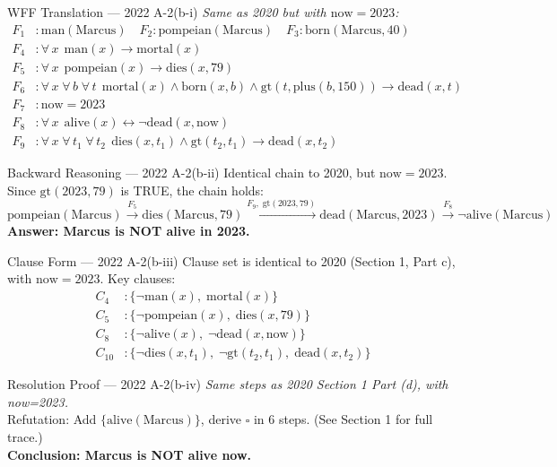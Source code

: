 \documentclass[12pt,a4paper]{article}
\newcommand{\ALL}[1]{\forall\,#1\;}
\newcommand{\ra}{\rightarrow}
\newcommand{\lra}{\leftrightarrow}
\newcommand{\cl}[1]{\{#1\}}      %
\begin{document}
\begin{solbox}{WFF Translation --- 2022 A-2(b-i)}
\textit{Same as 2020 but with $\mathrm{now} = 2023$:}
\begin{align*}
  F_1&: \mathrm{man(Marcus)}\quad F_2: \mathrm{pompeian(Marcus)}\quad F_3: \mathrm{born(Marcus,40)}\\
  F_4&: \ALL{x}\,\mathrm{man}(x)\ra\mathrm{mortal}(x)\\
  F_5&: \ALL{x}\,\mathrm{pompeian}(x)\ra\mathrm{dies}(x,79)\\
  F_6&: \ALL{x}\ALL{b}\ALL{t}\,\mathrm{mortal}(x)\land\mathrm{born}(x,b)\land\mathrm{gt}(t,\mathrm{plus}(b,150))\ra\mathrm{dead}(x,t)\\
  F_7&: \mathrm{now}=2023\\
  F_8&: \ALL{x}\,\mathrm{alive}(x)\lra\neg\mathrm{dead}(x,\mathrm{now})\\
  F_9&: \ALL{x}\ALL{t_1}\ALL{t_2}\,\mathrm{dies}(x,t_1)\land\mathrm{gt}(t_2,t_1)\ra\mathrm{dead}(x,t_2)
\end{align*}
\end{solbox}

\begin{solbox}{Backward Reasoning --- 2022 A-2(b-ii)}
Identical chain to 2020, but $\mathrm{now}=2023$. Since $\mathrm{gt}(2023,79)$ is TRUE, the chain holds:
\[\mathrm{pompeian(Marcus)}\xrightarrow{F_5}\mathrm{dies(Marcus,79)}\xrightarrow{F_9,\;\mathrm{gt}(2023,79)}\mathrm{dead(Marcus,2023)}\xrightarrow{F_8}\neg\mathrm{alive(Marcus)}\]
\textbf{Answer: Marcus is NOT alive in 2023.}
\end{solbox}

\begin{solbox}{Clause Form --- 2022 A-2(b-iii)}
Clause set is identical to 2020 (Section 1, Part c), with $\mathrm{now}=2023$. Key clauses:
\begin{align*}
  C_4&: \cl{\neg\mathrm{man}(x),\;\mathrm{mortal}(x)}\\
  C_5&: \cl{\neg\mathrm{pompeian}(x),\;\mathrm{dies}(x,79)}\\
  C_8&: \cl{\neg\mathrm{alive}(x),\;\neg\mathrm{dead}(x,\mathrm{now})}\\
  C_{10}&: \cl{\neg\mathrm{dies}(x,t_1),\;\neg\mathrm{gt}(t_2,t_1),\;\mathrm{dead}(x,t_2)}
\end{align*}
\end{solbox}

\begin{solbox}{Resolution Proof --- 2022 A-2(b-iv)}
\textit{Same steps as 2020 Section 1 Part (d), with now=2023.}\\
Refutation: Add $\cl{\mathrm{alive(Marcus)}}$, derive $\square$ in 6 steps. (See Section 1 for full trace.)\\
\textbf{Conclusion: Marcus is NOT alive now.} \checkmark
\end{solbox}
\end{document}

